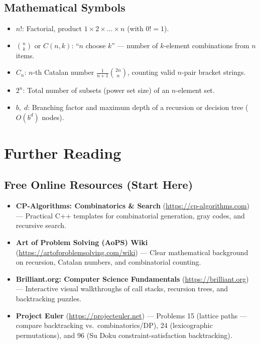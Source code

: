 \documentclass[11pt,a4paper]{article}
\theoremstyle{definition}
\begin{document}
\subsection*{Mathematical Symbols}
\begin{itemize}
    \item $n!$: Factorial, product $1 \times 2 \times \dots \times n$ (with $0! = 1$).
    \item $\binom{n}{k}$ or $C(n, k)$: ``$n$ choose $k$'' --- number of $k$-element combinations from $n$ items.
    \item $C_n$: $n$-th Catalan number $\frac{1}{n+1}\binom{2n}{n}$, counting valid $n$-pair bracket strings.
    \item $2^n$: Total number of subsets (power set size) of an $n$-element set.
    \item $b,\; d$: Branching factor and maximum depth of a recursion or decision tree ($O(b^d)$ nodes).
\end{itemize}

\section{Further Reading}

\subsection*{Free Online Resources (Start Here)}
\begin{itemize}
    \item \textbf{CP-Algorithms: Combinatorics \& Search} (\url{https://cp-algorithms.com}) --- Practical C++ templates for combinatorial generation, gray codes, and recursive search.
    \item \textbf{Art of Problem Solving (AoPS) Wiki} (\url{https://artofproblemsolving.com/wiki}) --- Clear mathematical background on recursion, Catalan numbers, and combinatorial counting.
    \item \textbf{Brilliant.org: Computer Science Fundamentals} (\url{https://brilliant.org}) --- Interactive visual walkthroughs of call stacks, recursion trees, and backtracking puzzles.
    \item \textbf{Project Euler} (\url{https://projecteuler.net}) --- Problems 15 (lattice paths --- compare backtracking vs.\ combinatorics/DP), 24 (lexicographic permutations), and 96 (Su Doku constraint-satisfaction backtracking).
\end{itemize}
\end{document}
